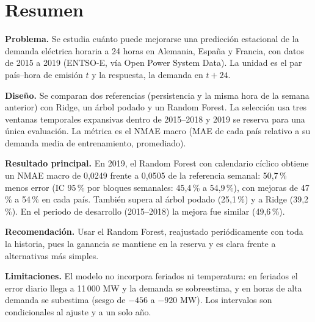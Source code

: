 \section{Resumen}

\textbf{Problema.} Se estudia cuánto puede mejorarse una predicción estacional de la demanda eléctrica horaria a 24 horas en Alemania, España y Francia, con datos de 2015 a 2019 (ENTSO-E, vía Open Power System Data). La unidad es el par país--hora de emisión $t$ y la respuesta, la demanda en $t+24$.

\textbf{Diseño.} Se comparan dos referencias (persistencia y la misma hora de la semana anterior) con Ridge, un árbol podado y un Random Forest. La selección usa tres ventanas temporales expansivas dentro de 2015--2018 y 2019 se reserva para una única evaluación. La métrica es el NMAE macro (MAE de cada país relativo a su demanda media de entrenamiento, promediado).

\textbf{Resultado principal.} En 2019, el Random Forest con calendario cíclico obtiene un NMAE macro de 0,0249 frente a 0,0505 de la referencia semanal: 50,7\,\% menos error (IC 95\,\% por bloques semanales: 45,4\,\% a 54,9\,\%), con mejoras de 47\,\% a 54\,\% en cada país. También supera al árbol podado (25,1\,\%) y a Ridge (39,2\,\%). En el periodo de desarrollo (2015--2018) la mejora fue similar (49,6\,\%).

\textbf{Recomendación.} Usar el Random Forest, reajustado periódicamente con toda la historia, pues la ganancia se mantiene en la reserva y es clara frente a alternativas más simples.

\textbf{Limitaciones.} El modelo no incorpora feriados ni temperatura: en feriados el error diario llega a 11\,000 MW y la demanda se sobreestima, y en horas de alta demanda se subestima (sesgo de $-456$ a $-920$ MW). Los intervalos son condicionales al ajuste y a un solo año.
